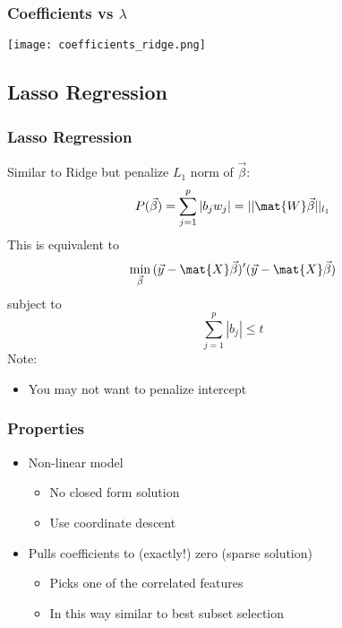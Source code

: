 \documentclass[mathserif, xcolor=table, svgnames]{beamer}
\begin{document}
\begin{frame}
  \frametitle{Coefficients vs $\lambda$}
  \begin{center}
    \texttt{[image: coefficients\_ridge.png]}
  \end{center}
\end{frame}

\subsection{Lasso Regression}
\frame{\tableofcontents[currentsubsection]}

\begin{frame}
  \frametitle{Lasso Regression}
  Similar to Ridge but penalize $L_{1}$ norm of $\vec{\beta}$:
  \begin{equation*}
    P(\vec{\beta}) =  \sum_{j=1}^{p} |b_{j} w_{j}|
    =
    || \mat{W} \vec{\beta} ||_{l_{1}}
  \end{equation*}
  This is equivalent to
  \begin{equation*}
    \min_{\vec{\beta}} \, (\vec{y} - \mat{X}\vec{\beta})'(\vec{y} - \mat{X}\vec{\beta})
  \end{equation*}
  subject to
  \begin{equation*}
    \sum_{j=1}^{p} |b_{j}| \le t
  \end{equation*}
  Note:
  \begin{itemize}
  \item You may not want to penalize intercept
  \end{itemize}
\end{frame}

\begin{frame}
  \frametitle{Properties}
  \begin{itemize}
  \item Non-linear model
    \begin{itemize}
    \item No closed form solution
    \item Use coordinate descent
    \end{itemize}
  \item Pulls coefficients to (exactly!) zero (sparse solution)
    \begin{itemize}
    \item Picks one of the correlated features
    \item In this way similar to best subset selection
    \end{itemize}
  \end{itemize}
\end{frame}
\end{document}
